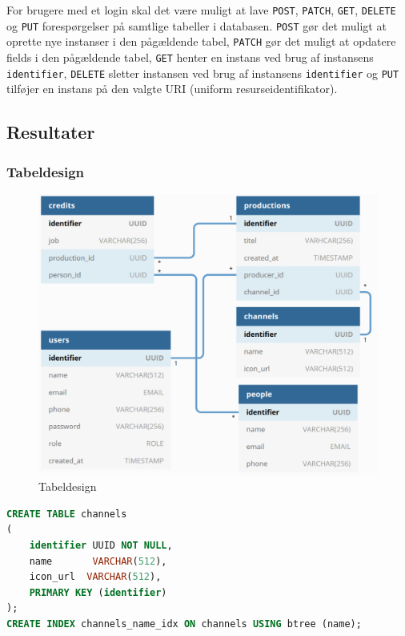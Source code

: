 For brugere med et login skal det være muligt at lave \texttt{POST}, \texttt{PATCH}, \texttt{GET}, \texttt{DELETE} og \texttt{PUT} forespørgelser på samtlige tabeller i databasen. \texttt{POST} gør det muligt at oprette nye instanser i den pågældende tabel, \texttt{PATCH} gør det muligt at opdatere fields i den pågældende tabel, \texttt{GET} henter en instans ved brug af instansens \texttt{identifier}, \texttt{DELETE} sletter instansen ved brug af instansens \texttt{identifier} og \texttt{PUT} tilføjer en instans på den valgte URI (uniform resurseidentifikator).

\subsection{Resultater}
\subsubsection{Tabeldesign}
\begin{figure}[ht]
    \centering
    \includegraphics[scale=0.5]{figures/database_design.pdf}  
    \caption{Tabeldesign}
    \label{fig:tabledesign}
\end{figure}{}


\begin{lstlisting}[language=sql, caption=channels.sql]
CREATE TABLE channels
(
    identifier UUID NOT NULL,
    name       VARCHAR(512),
    icon_url  VARCHAR(512),
    PRIMARY KEY (identifier)
);
CREATE INDEX channels_name_idx ON channels USING btree (name);
\end{lstlisting}


